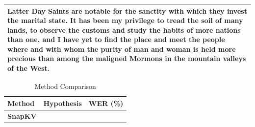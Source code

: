\documentclass[11pt]{article}
\begin{document}
\begin{table}[h]
\begin{tabularx}{\textwidth}{|X|}
Latter Day Saints are notable for the sanctity with which they invest the marital state. It has been my privilege to tread the soil of many lands, to observe the customs and study the habits of more nations than one, and I have yet to find the place and meet the people where and with whom the purity of man and woman is held more precious than among the maligned Mormons in the mountain valleys of the West. \\
\hline
\end{tabularx}
\end{table}

\begin{table}[h]
\centering
\caption{Method Comparison}
\label{tab:methods}
\begin{tabularx}{\textwidth}{|l|X|c|}
\hline
\rowcolor{lightgray}
\textbf{Method} & \textbf{Hypothesis} & \textbf{WER (\%)} \\
\hline
\rowcolor{snapkvcolor}
\textbf{SnapKV} & 
\begin{minipage}[t]{\linewidth}

\end{minipage}
\end{tabularx}
\end{table}
\end{document}

